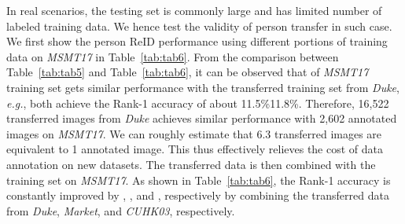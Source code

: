 \documentclass[10pt,twocolumn,letterpaper]{article}
\begin{document}
In real scenarios, the testing set is commonly large and has limited number of labeled training data. We hence test the validity of person transfer in such case. We first show the person ReID performance using different portions of training data on \emph{MSMT17} in Table~\ref{tab:tab6}. From the comparison between Table~\ref{tab:tab5} and Table~\ref{tab:tab6}, it can be observed that  of \emph{MSMT17} training set gets similar performance with the transferred training set from \emph{Duke}, \emph{e.g.}, both achieve the Rank-1 accuracy of about 11.5\%11.8\%. Therefore, 16,522 transferred images from \emph{Duke} achieves similar performance with 2,602 annotated images on \emph{MSMT17}. We can roughly estimate that 6.3 transferred images are equivalent to 1 annotated image. This thus effectively relieves the cost of data annotation on new datasets. The transferred data is then combined with the training set on \emph{MSMT17}. As shown in Table~\ref{tab:tab6}, the Rank-1 accuracy is constantly improved by , , and , respectively by combining the transferred data from \emph{Duke}, \emph{Market}, and \emph{CUHK03}, respectively.


\begin{table}
\footnotesize
\caption{The performance of GoogLeNet tested on \emph{MSMT17}. The subscript  denotes the transferred target dataset \emph{MSMT17}.}\label{tab:tab5}

\begin{center}
\vspace{-5mm}
\end{center}
\end{table}
\end{document}
